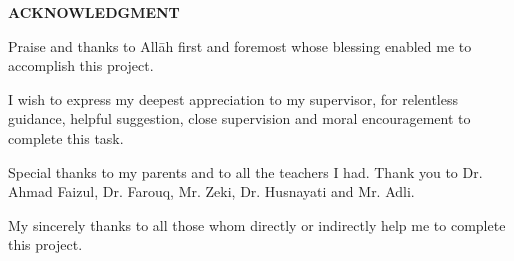 \documentclass[a4paper]{memoir}
\begin{document}
\thispagestyle{empty}

\begin{center}
  {\fontsize{16pt}{16pt}\selectfont
    \textbf{\MakeTextUppercase{Acknowledgment}}\\[48pt]
  }
\end{center}

Praise and thanks to Allāh first and foremost whose blessing enabled me to accomplish this project.

I wish to express my deepest appreciation to my supervisor, \mySupervisor for relentless guidance, helpful suggestion, close supervision and moral encouragement to complete this task.

Special thanks to my parents and to all the teachers I had. Thank you to Dr. Ahmad Faizul, Dr. Farouq, Mr. Zeki, Dr. Husnayati and Mr. Adli.

My sincerely thanks to all those whom directly or indirectly help me to
complete this project.

\lipsum[1-2]
\end{document}
